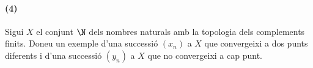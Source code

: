 \paragraph{(4)}
Sigui $X$ el conjunt $\N$ dels nombres naturals amb la topologia dels complements finits. Doneu un exemple d'una successió $(x_n)$ a $X$ que convergeixi a dos punts diferents i d'una successió $(y_n)$ a $X$ que no convergeixi a cap punt.\\
